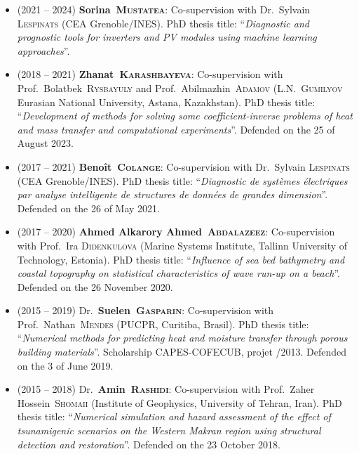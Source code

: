 \documentclass[final, a4paper, oneside, 12pt]{article}
\numberwithin{equation}{section}
\begin{document}
\begin{itemize}
  \item (2021 -- 2024) \textbf{Sorina~\textsc{Mustatea}}: Co-supervision with Dr.~Sylvain \textsc{Lespinats} (CEA Grenoble/INES). PhD thesis title: ``\textit{Diagnostic and prognostic tools for inverters and PV modules using machine learning approaches}''.

  \item (2018 -- 2021) \textbf{Zhanat~\textsc{Karashbayeva}}: Co-supervision with Prof.~Bolatbek~\textsc{Rysbayuly} and Prof.~Abilmazhin~\textsc{Adamov} (L.N.~\textsc{Gumilyov} Eurasian National University, Astana, Kazakhstan). PhD thesis title: ``\textit{Development of methods for solving some coefficient-inverse problems of heat and mass transfer and computational experiments}''. Defended on the 25 of August 2023.
  
  \item (2017 -- 2021) \textbf{Beno\^it~\textsc{Colange}}: Co-supervision with Dr.~Sylvain \textsc{Lespinats} (CEA Grenoble/INES). PhD thesis title: ``\textit{Diagnostic de syst\`emes \'electriques par analyse intelligente de structures de donn\'ees de grandes dimension}''. Defended on the 26 of May 2021.
  
  \item (2017 -- 2020) \textbf{Ahmed Alkarory Ahmed~\textsc{Abdalazeez}}: Co-supervision with Prof.~Ira \textsc{Didenkulova} (Marine Systems Institute, Tallinn University of Technology, Estonia). PhD thesis title: ``\textit{Influence of sea bed bathymetry and coastal topography on statistical characteristics of wave run-up on a beach}''. Defended on the 26 November 2020.

  \item (2015 -- 2019) Dr.~\textbf{Suelen~\textsc{Gasparin}}: Co-supervision with Prof.~Nathan~\textsc{Mendes} (PUCPR, Curitiba, Brasil). PhD thesis title: ``\textit{Numerical methods for predicting heat and moisture transfer through porous building materials}''. Scholarship CAPES-COFECUB, projet /2013. Defended on the 3 of June 2019.
  
  \item (2015 -- 2018) Dr.~\textbf{Amin~\textsc{Rashidi}}: Co-supervision with Prof.~Zaher Hossein~\textsc{Shomaii} (Institute of Geophysics, University of Tehran, Iran). PhD thesis title: ``\textit{Numerical simulation and hazard assessment of the effect of tsunamigenic scenarios on the Western Makran region using structural detection and restoration}''. Defended on the 23 October 2018.


\end{itemize}
\end{document}
